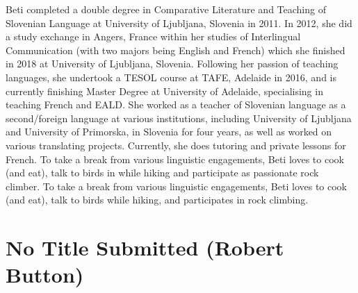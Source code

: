 \documentclass[twoside,14pt,a4paper,notitlepage]{memoir}
\begin{document}
Beti completed a double degree in Comparative Literature and Teaching of Slovenian Language at University of Ljubljana, Slovenia in 2011. In 2012, she did a study exchange in Angers, France within her studies of Interlingual Communication (with two majors being English and French) which she finished in 2018 at University of Ljubljana, Slovenia. Following her passion of teaching languages, she undertook a TESOL course at TAFE, Adelaide in 2016, and is currently finishing Master Degree at University of Adelaide, specialising in teaching French and EALD. 
She worked as a teacher of Slovenian language as a second/foreign language at various institutions, including University of Ljubljana and University of Primorska, in Slovenia for four years, as well as worked on various translating projects. Currently, she does tutoring and private lessons for French.
To take a break from various linguistic engagements, Beti loves to cook (and eat), talk to birds in while hiking and participate as passionate rock climber. 
To take a break from various linguistic engagements, Beti loves to cook (and eat), talk to birds while hiking, and participates in rock climbing.



\section*{No Title Submitted (Robert Button)}
\label{aut:button}
\end{document}
